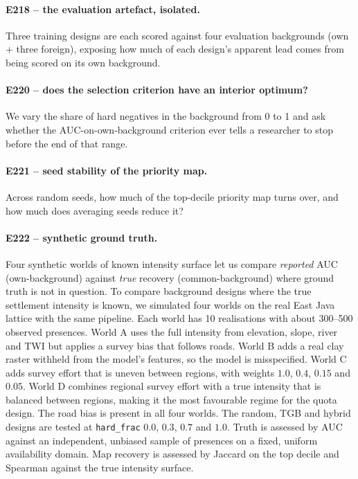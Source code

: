 \documentclass[12pt]{article}
\begin{document}
\paragraph{E218 -- the evaluation artefact, isolated.}
Three training designs are each scored against four evaluation backgrounds (own + three foreign), exposing how much of each design's apparent lead comes from being scored on its own background.

\paragraph{E220 -- does the selection criterion have an interior optimum?}
We vary the share of hard negatives in the background from 0 to 1 and ask whether the AUC-on-own-background criterion ever tells a researcher to stop before the end of that range.

\paragraph{E221 -- seed stability of the priority map.}
Across random seeds, how much of the top-decile priority map turns over, and how much does averaging seeds reduce it?

\paragraph{E222 -- synthetic ground truth.}
Four synthetic worlds of known intensity surface let us compare \emph{reported} AUC (own-background) against \emph{true} recovery (common-background) where ground truth is not in question.
To compare background designs where the true settlement intensity is known, we simulated four worlds on the real East Java lattice with the same pipeline.
Each world has 10 realisations with about 300--500 observed presences.
World A uses the full intensity from elevation, slope, river and TWI but applies a survey bias that follows roads.
World B adds a real clay raster withheld from the model's features, so the model is misspecified.
World C adds survey effort that is uneven between regions, with weights $1.0$, $0.4$, $0.15$ and $0.05$.
World D combines regional survey effort with a true intensity that is balanced between regions, making it the most favourable regime for the quota design.
The road bias is present in all four worlds.
The random, TGB and hybrid designs are tested at \texttt{hard\_frac} $0.0$, $0.3$, $0.7$ and $1.0$.
Truth is assessed by AUC against an independent, unbiased sample of presences on a fixed, uniform availability domain.
Map recovery is assessed by Jaccard on the top decile and Spearman against the true intensity surface.
\end{document}
